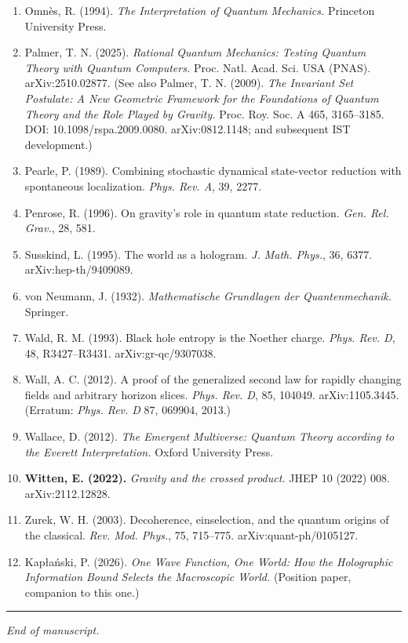 \documentclass[11pt,a4paper]{article}
\begin{document}
\begin{enumerate}
  \item Omnès, R. (1994). \emph{The Interpretation of Quantum Mechanics.} Princeton University Press.
  \item Palmer, T. N. (2025). \emph{Rational Quantum Mechanics: Testing Quantum Theory with Quantum Computers.} Proc. Natl. Acad. Sci. USA (PNAS). arXiv:2510.02877. (See also Palmer, T. N. (2009). \emph{The Invariant Set Postulate: A New Geometric Framework for the Foundations of Quantum Theory and the Role Played by Gravity.} Proc. Roy. Soc. A 465, 3165–3185. DOI: 10.1098/rspa.2009.0080. arXiv:0812.1148; and subsequent IST development.)
  \item Pearle, P. (1989). Combining stochastic dynamical state-vector reduction with spontaneous localization. \emph{Phys. Rev. A}, 39, 2277.
  \item Penrose, R. (1996). On gravity's role in quantum state reduction. \emph{Gen. Rel. Grav.}, 28, 581.
  \item Susskind, L. (1995). The world as a hologram. \emph{J. Math. Phys.}, 36, 6377. arXiv:hep-th/9409089.
  \item von Neumann, J. (1932). \emph{Mathematische Grundlagen der Quantenmechanik.} Springer.
  \item Wald, R. M. (1993). Black hole entropy is the Noether charge. \emph{Phys. Rev. D}, 48, R3427–R3431. arXiv:gr-qc/9307038.
  \item Wall, A. C. (2012). A proof of the generalized second law for rapidly changing fields and arbitrary horizon slices. \emph{Phys. Rev. D}, 85, 104049. arXiv:1105.3445. (Erratum: \emph{Phys. Rev. D} 87, 069904, 2013.)
  \item Wallace, D. (2012). \emph{The Emergent Multiverse: Quantum Theory according to the Everett Interpretation.} Oxford University Press.
  \item \textbf{Witten, E. (2022).} \emph{Gravity and the crossed product.} JHEP 10 (2022) 008. arXiv:2112.12828.
  \item Zurek, W. H. (2003). Decoherence, einselection, and the quantum origins of the classical. \emph{Rev. Mod. Phys.}, 75, 715–775. arXiv:quant-ph/0105127.
  \item Kapłański, P. (2026). \emph{One Wave Function, One World: How the Holographic Information Bound Selects the Macroscopic World.} (Position paper, companion to this one.)
\end{enumerate}

\medskip\hrule\medskip

\emph{End of manuscript.}
\end{document}
